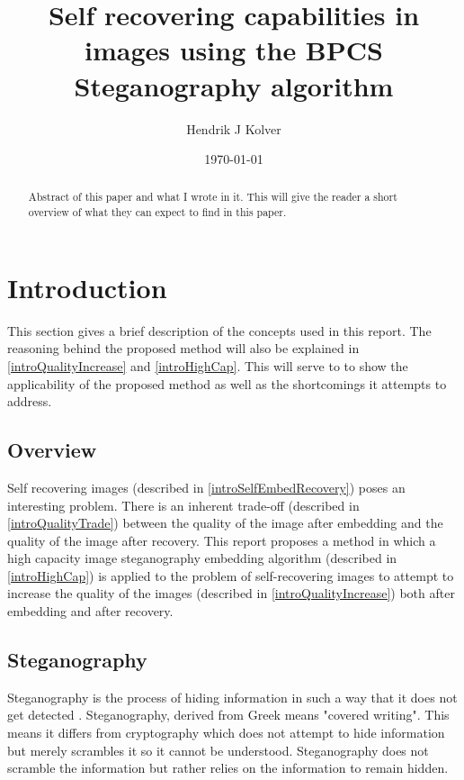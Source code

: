 \documentclass[12pt]{article}
\title{Self recovering capabilities in images using the BPCS Steganography algorithm}
\author{Hendrik J Kolver}
\date{\today}
\begin{document}
\maketitle

\begin{abstract}

\noindent Abstract of this paper and what I wrote in it.
This will give the reader a short overview of what they can expect to find in this paper.

\end{abstract}

\tableofcontents

\section{Introduction}


This section gives a brief description of the concepts used in this report.
The reasoning behind the proposed method will also be explained in \ref{introQualityIncrease} and \ref{introHighCap}.
This will serve to to show the applicability of the proposed method as well as the shortcomings it attempts to address. 

\subsection{Overview}
Self recovering images (described in \ref{introSelfEmbedRecovery}) poses an interesting problem.
There is an inherent trade-off (described in \ref{introQualityTrade}) between the quality of the image after embedding and the quality of the image after recovery.
This report proposes a method in which a high capacity image steganography embedding algorithm (described in \ref{introHighCap}) is applied to the problem of self-recovering images to attempt to increase the quality of the images (described in \ref{introQualityIncrease}) both after embedding and after recovery.


\subsection{Steganography}
\label{introSteganography}
Steganography is the process of hiding information in such a way that it does not get detected \cite{johnson1998exploring}.
Steganography, derived from Greek means "covered writing".
This means it differs from cryptography which does not attempt to hide information but merely scrambles it so it cannot be understood.
Steganography does not scramble the information but rather relies on the information to remain hidden. 
\end{document}
